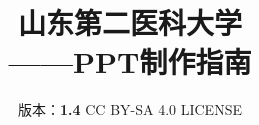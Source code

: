 

\title{%
    {\Huge\textbf{山东第二医科大学\\[5pt]——PPT制作指南}}%
}
\author{%
    版本：\textbf{1.4} \qquad%
    CC BY-SA 4.0 LICENSE \qquad%
    }
\date{\CurrentCustomTime}
\maketitle

\renewcommand{\thefootnote}{\arabic{footnote}}
